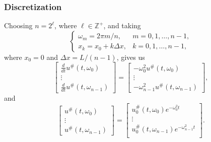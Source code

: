 \documentclass{beamer}
\begin{document}
\begin{frame}
	\frametitle{Discretization}
	Choosing $n = 2^{\ell}$, where $\ell \in \mathbb{Z}^+$, and taking
	\begin{equation*}
		\begin{cases}
			\omega_m = 2\pi m/n, & m = 0,1,\dots,n-1, \\
			x_k = x_0 + k\Delta x, & k = 0,1,\dots,n-1,
		\end{cases}
	\end{equation*}
	where $x_0 = 0$ and $\Delta x = L/(n-1)$, gives us
	\begin{equation*}
		\begin{bmatrix}
			\frac{d}{dt}u^{\#}(t,\omega_0) \\
			\vdots \\
			\frac{d}{dt}u^{\#}(t,\omega_{n-1})
		\end{bmatrix}
		=
		\begin{bmatrix}
			-\omega_0^2u^{\#}(t,\omega_0) \\
			\vdots \\
			-\omega_{n-1}^2u^{\#}(t,\omega_{n-1})
		\end{bmatrix},
	\end{equation*}
	and
	\begin{equation*}
		\begin{bmatrix}
			u^{\#}(t,\omega_0) \\
			\vdots \\
			u^{\#}(t,\omega_{n-1})
		\end{bmatrix}
		=
		\begin{bmatrix}
			u_0^{\#}(t,\omega_0)e^{-\omega_0^2t} \\
			\vdots \\
			u_0^{\#}(t,\omega_{n-1})e^{-\omega_{n-1}^2t} \\
		\end{bmatrix}.
	\end{equation*}
\end{frame}
\end{document}
